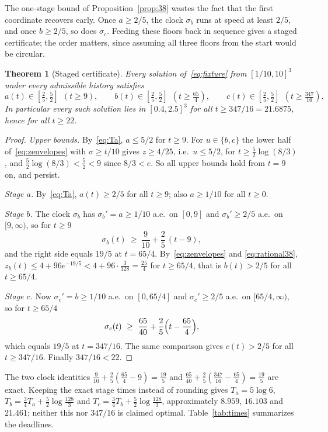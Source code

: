 \documentclass[11pt]{article}
\newtheorem{theorem}{Theorem}[section]
\theoremstyle{definition}
\theoremstyle{remark}
\begin{document}
The one-stage bound of Proposition~\ref{prop:38} wastes the fact that the first
coordinate recovers early. Once
$a\ge2/5$, the clock $\sigma_b$ runs at speed at least $2/5$, and once $b\ge2/5$,
so does $\sigma_c$. Feeding these floors back in sequence gives a staged
certificate; the order matters, since assuming all three floors from the start
would be circular.

\begin{theorem}[Staged certificate]\label{thm:staged}
Every solution of~\eqref{eq:fixture} from $[1/10,10]^3$ under every admissible
history satisfies
\[
 a(t)\in[\tfrac25,\tfrac52]\ \ (t\ge9),\qquad
 b(t)\in[\tfrac25,\tfrac52]\ \ (t\ge\tfrac{65}{4}),\qquad
 c(t)\in[\tfrac25,\tfrac52]\ \ (t\ge\tfrac{347}{16}).
\]
In particular every such solution lies in $[0.4,2.5]^3$ for all $t\ge347/16=21.6875$,
hence for all $t\ge22$.
\end{theorem}
\begin{proof}
\emph{Upper bounds.} By~\eqref{eq:Ta}, $a\le5/2$ for $t\ge9$. For $u\in\{b,c\}$
the lower half of~\eqref{eq:zenvelopes} with $\sigma\ge t/10$ gives $z\ge4/25$,
i.e.\ $u\le5/2$, for $t\ge\frac52\log(8/3)$, and $\frac52\log(8/3)<\frac52<9$ since
$8/3<e$. So all upper bounds hold from $t=9$ on, and persist.

\emph{Stage $a$.} By~\eqref{eq:Ta}, $a(t)\ge2/5$ for all $t\ge9$; also $a\ge1/10$
for all $t\ge0$.

\emph{Stage $b$.} The clock $\sigma_b$ has $\sigma_b'=a\ge1/10$ a.e.\ on $[0,9]$ and
$\sigma_b'\ge2/5$ a.e.\ on $[9,\infty)$, so for $t\ge9$
\[
 \sigma_b(t)\ \ge\ \frac{9}{10}+\frac25\,(t-9),
\]
and the right side equals $19/5$ at $t=65/4$. By~\eqref{eq:zenvelopes} and
\eqref{eq:rational38}, $z_b(t)\le4+96e^{-19/5}<4+96\cdot\frac{3}{128}=\frac{25}{4}$
for $t\ge65/4$, that is $b(t)>2/5$ for all $t\ge65/4$.

\emph{Stage $c$.} Now $\sigma_c'=b\ge1/10$ a.e.\ on $[0,65/4]$ and $\sigma_c'\ge2/5$
a.e.\ on $[65/4,\infty)$, so for $t\ge65/4$
\[
 \sigma_c(t)\ \ge\ \frac{65}{40}+\frac25\Bigl(t-\frac{65}{4}\Bigr),
\]
which equals $19/5$ at $t=347/16$. The same comparison gives $c(t)>2/5$ for all
$t\ge347/16$. Finally $347/16<22$.
\end{proof}

The two clock identities $\frac9{10}+\frac25(\frac{65}4-9)=\frac{19}5$ and
$\frac{65}{40}+\frac25(\frac{347}{16}-\frac{65}4)=\frac{19}5$ are exact. Keeping the
exact stage times instead of rounding gives $T_a=5\log6$,
$T_b=\frac34T_a+\frac52\log\frac{128}{3}$ and $T_c=\frac34T_b+\frac52\log\frac{128}3$,
approximately $8.959$, $16.103$ and $21.461$; neither this nor $347/16$ is claimed
optimal. Table~\ref{tab:times} summarizes the deadlines.
\end{document}

